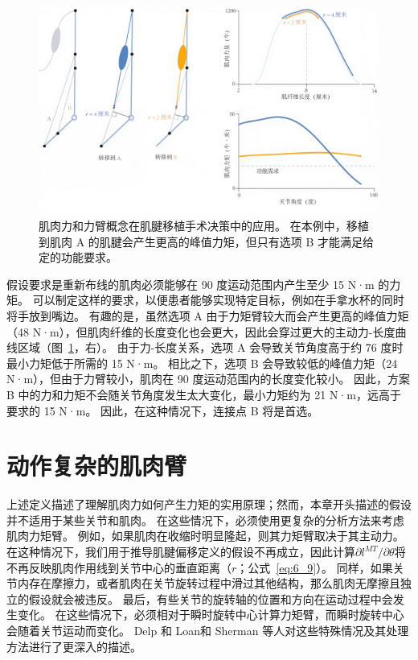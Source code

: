 \begin{figure}[!htb]
	\centering
	\includegraphics[width=1.0\linewidth]{chap6/6_14}
	\caption{肌肉力和力臂概念在肌腱移植手术决策中的应用。
		在本例中，移植到肌肉 A 的肌腱会产生更高的峰值力矩，但只有选项 B 才能满足给定的功能要求。 \label{fig:6_14}}
\end{figure}


假设要求是重新布线的肌肉必须能够在 90 度运动范围内产生至少 15 N·m 的力矩。
可以制定这样的要求，以便患者能够实现特定目标，例如在手拿水杯的同时将手放到嘴边。
有趣的是，虽然选项 A 由于力矩臂较大而会产生更高的峰值力矩（48 N·m），但肌肉纤维的长度变化也会更大，因此会穿过更大的主动力-长度曲线区域（图~\ref{fig:6_14}，右）。
由于力-长度关系，选项 A 会导致关节角度高于约 76 度时最小力矩低于所需的 15 N·m。
相比之下，选项 B 会导致较低的峰值力矩（24 N·m），但由于力臂较小，肌肉在 90 度运动范围内的长度变化较小。
因此，方案 B 中的力和力矩不会随关节角度发生太大变化，最小力矩约为 21 N·m，远高于要求的 15 N·m。
因此，在这种情况下，连接点 B 将是首选。



\section{动作复杂的肌肉臂}

上述定义描述了理解肌肉力如何产生力矩的实用原理；然而，本章开头描述的假设并不适用于某些关节和肌肉。
在这些情况下，必须使用更复杂的分析方法来考虑肌肉力矩臂。
例如，如果肌肉在收缩时明显隆起，则其力矩臂取决于其主动力。
在这种情况下，我们用于推导肌腱偏移定义的假设不再成立，因此计算$\partial l^{MT} / \partial \theta$将不再反映肌肉作用线到关节中心的垂直距离（$r$；公式~\ref{eq:6_9}）。
同样，如果关节内存在摩擦力，或者肌肉在关节旋转过程中滑过其他结构，那么肌肉无摩擦且独立的假设就会被违反。
最后，有些关节的旋转轴的位置和方向在运动过程中会发生变化。
在这些情况下，必须相对于瞬时旋转中心计算力矩臂，而瞬时旋转中心会随着关节运动而变化。 
Delp 和 Loan\cite{delp1995graphics}和 Sherman 等人\cite{sherman2013moment}对这些特殊情况及其处理方法进行了更深入的描述。


